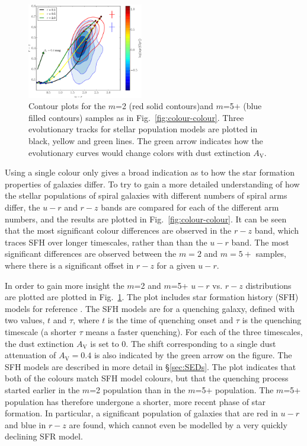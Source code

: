 \documentclass[useAMS,usenatbib]{mn2e}
\begin{document}
\begin{figure}
		\centering

        \includegraphics[width=0.45\textwidth]{Images/Results/cc1_w_sfh.pdf}

        \caption{Contour plots for the $m$=2 (red solid contours)and $m$=5+ (blue filled contours) samples as in Fig.~\ref{fig:colour-colour}. Three evolutionary tracks for \citet{BC_03} stellar population models are plotted in black, yellow and green lines. The green arrow indicates how the evolutionary curves would change colors with dust extinction $A_\mathrm{V}$.}

        \label{fig:cc_w_sfh}

\end{figure}

Using a single colour only gives a broad indication as to how the star formation properties of galaxies differ. To try to gain a more detailed understanding of how the stellar populations of spiral galaxies with different numbers of spiral arms differ, the $u-r$ and $r-z$ bands are compared for each of the different arm numbers, and the results are plotted in Fig.~\ref{fig:colour-colour}. It can be seen that the most significant colour differences are observed in the $r-z$ band, which traces SFH over longer timescales, rather than than the $u-r$ band. The most significant differences are observed between the $m=2$ and $m=5+$ samples, where there is a significant offset in $r-z$ for a given $u-r$. 

In order to gain more insight the $m$=2 and $m$=5+ $u-r$ vs. $r-z$ distributions are plotted are plotted  in Fig.~\ref{fig:cc_w_sfh}. The plot includes star formation history (SFH) models for reference \citep{BC_03}. The SFH models are for a  quenching galaxy, defined with two values, $t$ and $\tau$, where $t$ is the time of quenching onset and $\tau$ is the quenching timescale (a shorter $\tau$ means a faster quenching). For each of the three timescales, the dust extinction $A_\mathrm{V}$ is set to 0. The shift corresponding to a single dust attenuation of $A_\mathrm{V} =0.4$ is also indicated by the green arrow on the figure. The SFH models are described in more detail in \S\ref{sec:SEDs}. The plot indicates that both of the colours match SFH model colours, but that the quenching process started earlier in the $m$=2 population than in the $m$=5+ population. The $m$=5+ population has therefore undergone a shorter, more recent phase of star formation. In particular, a significant population of galaxies that are red in $u-r$ and blue in $r-z$ are found, which cannot even be modelled by a very quickly declining SFR model.
\end{document}
